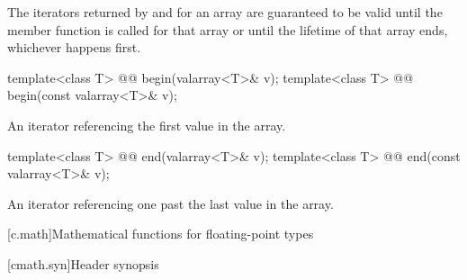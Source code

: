 \pnum
The iterators returned by  and  for an array
are guaranteed to be valid until the member function
 is called for that
array or until the lifetime of that array ends, whichever happens
first.

%
\begin{itemdecl}
template<class T> @@ begin(valarray<T>& v);
template<class T> @@ begin(const valarray<T>& v);
\end{itemdecl}

\begin{itemdescr}
\pnum
\returns
An iterator referencing the first value in the array.
\end{itemdescr}

%
\begin{itemdecl}
template<class T> @@ end(valarray<T>& v);
template<class T> @@ end(const valarray<T>& v);
\end{itemdecl}

\begin{itemdescr}
\pnum
\returns
An iterator referencing one past the last value in the array.
\end{itemdescr}

[c.math]{Mathematical functions for floating-point types}

[cmath.syn]{Header  synopsis}

